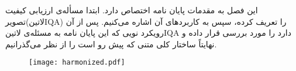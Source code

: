 این فصل به مقدمات پایان نامه اختصاص دارد. ابتدا مسأله‌ی ارزیابی کیفیت تصویر(‌لاتین{IQA}) را تعریف کرده، سپس به کاربردهای آن اشاره می‌کنیم. پس از آن رویکرد نویی که این پایان نامه به مسئله‌ی ‌لاتین{IQA} دارد را مورد بررسی قرار داده و نهایتاً ساختار کلی متنی که پیش رو است را از نظر می‌گذرانیم.


\begin{figure}[ht]
  \centering
  \texttt{[image: harmonized.pdf]}
  \label{شکل:دسته‌های‌IQA}
\end{figure}

